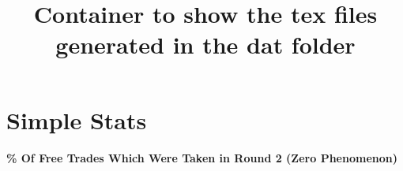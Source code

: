 \documentclass[onecolumn,10pt]{article}
\title{Container to show the tex files generated in the dat folder}
\author{}
\begin{document}
\newcommand{\todo}[1]{\textsf{\color{todocolor} #1}}

\maketitle

\section{Simple Stats}
\textbf{\% Of Free Trades Which Were Taken in Round 2 (Zero Phenomenon)}
\paragraph{}



\end{document}
